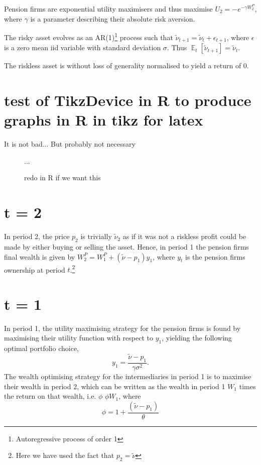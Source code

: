 \documentclass[11pt]{article}
\newcommand\fnote[1]{\captionsetup{font=small}\caption*{#1}}
\DeclareMathOperator{\E}{\mathbb{E}} %
\begin{document}
\begin{appendices}
Pension firms are exponential utility maximisers and thus maximise
 $U_2 = -e^{-\gamma W_2^P}$, where $\gamma$ is a parameter describing their absolute risk aversion.

The risky asset evolves as an AR(1)\footnote{Autoregressive process of order 1} process such that $\tilde{\nu}_{t+1} = \tilde{\nu}_t + \epsilon_{t+1}$, where $\epsilon$ is a zero mean iid variable with standard deviation $\sigma$. Thus $\E_t[\tilde{\nu}_{t+1}] = \tilde{\nu}_t$.

The riskless asset is without loss of generality normalised to yield a return of 0.


\section{test of TikzDevice in R to produce graphs in R in tikz for latex}
It is not bad... But probably not necessary
\begin{figure}%
	\centering
	\caption{redo in R if we want this}
	\fnote{...}
\end{figure}


\section*{t = 2}

In period 2, the price $p_2$ is trivially $\tilde{\nu}_2$ as if it was not a riskless profit could be made by either buying or selling the asset. Hence, in period 1 the pension firms final wealth is given by $W_2^P = W_1^P + (\tilde{\nu} - p_1)y_1$, where $y_t$ is the pension firms ownership at period $t$.\footnote{Here we have used the fact that $p_2 = \tilde{\nu}$}

\section*{t = 1}

In period 1, the utility maximising strategy for the pension firms is found by maximising their utility function with respect to $y_1$, yielding the following optimal portfolio choice,
\begin{equation}
y_1 = \frac{\tilde{\nu} - p_1}{\gamma \sigma^2}.
\end{equation}
The wealth optimising strategy for the intermediaries in period 1 is to maximise their wealth in period 2, which can be written as the wealth in period 1 $W_1$ times the return on that wealth, i.e. $\phi$ $\phi W_1$, where
\begin{equation}
\phi = 1 + \frac{(\tilde{\nu} - p_1)}{\theta}
\end{equation}


\end{appendices}
\end{document}
